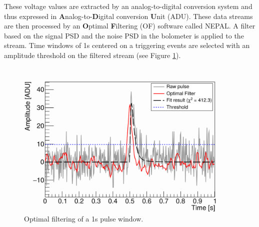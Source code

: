 These voltage values are extracted by an analog-to-digital conversion system and thus expressed in \textbf{A}nalog-to-\textbf{D}igital conversion \textbf{U}nit (ADU).
These data streams are then processed by an \textbf{O}ptimal \textbf{F}iltering (OF) software called NEPAL. A filter based on the signal PSD and the noise PSD in the bolometer is applied to the stream. Time windows of 1s centered on a triggering events are selected with an amplitude threshold on the filtered stream (see Figure \ref{fig:pulse-of}).

\begin{figure}
\centering
\includegraphics[width=\linewidth,]{Figures/Neutron/pulse_of.png}
\caption{Optimal filtering of a 1s pulse window.}
\label{fig:pulse-of}
\end{figure}

